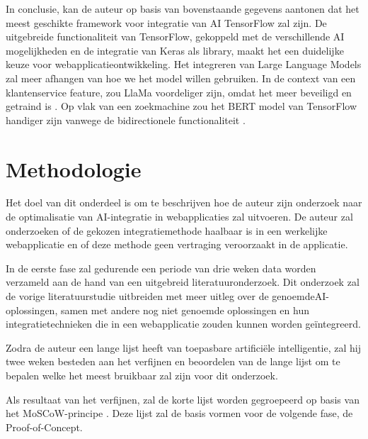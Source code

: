 \documentclass[dutch]{hogent-article}
\begin{document}
In conclusie, kan de auteur op basis van bovenstaande gegevens aantonen dat het meest geschikte framework voor integratie van AI TensorFlow zal zijn. De uitgebreide functionaliteit van TensorFlow, gekoppeld met de verschillende AI mogelijkheden en de integratie van Keras als library, maakt het een duidelijke keuze voor webapplicatieontwikkeling. Het integreren van Large Language Models zal meer afhangen van hoe we het model willen gebruiken. In de context van een klantenservice feature, zou LlaMa voordeliger zijn, omdat het meer beveiligd en getraind is \autocite{Touvron2023Llama2O}. Op vlak van een zoekmachine zou het BERT model van TensorFlow handiger zijn vanwege de bidirectionele functionaliteit \autocite{Devlin2018}.

\section{Methodologie}%
\label{sec:methodology}


Het doel van dit onderdeel is om te beschrijven hoe de auteur zijn onderzoek naar de optimalisatie van AI-integratie in webapplicaties zal uitvoeren. De auteur zal onderzoeken of de gekozen integratiemethode haalbaar is in een werkelijke webapplicatie en of deze methode geen vertraging veroorzaakt in de applicatie.

In de eerste fase zal gedurende een periode van drie weken data worden verzameld aan de hand van een uitgebreid literatuuronderzoek. Dit onderzoek zal de vorige literatuurstudie uitbreiden met meer uitleg over de genoemde\linebreak AI-oplossingen, samen met andere nog niet genoemde oplossingen en hun integratietechnieken die in een webapplicatie zouden kunnen worden geïntegreerd.

Zodra de auteur een lange lijst heeft van toepasbare artificiële intelligentie, zal hij twee weken besteden aan het verfijnen en beoordelen van de lange lijst om te bepalen welke het meest bruikbaar zal zijn voor dit onderzoek.

Als resultaat van het verfijnen, zal de korte lijst worden gegroepeerd op basis van het MoSCoW-principe \autocite{Nordenstam2014}. Deze lijst zal de basis vormen voor de volgende fase, de Proof-of-Concept.
\end{document}
